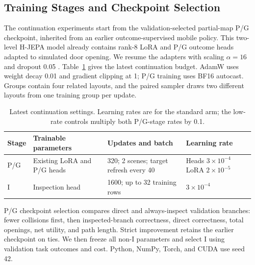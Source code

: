 \subsection{Training Stages and Checkpoint Selection}
The continuation experiments start from the validation-selected partial-map
P/G checkpoint, inherited from an earlier outcome-supervised mobile policy.
This two-level H-JEPA model already contains rank-8 LoRA and P/G outcome heads
adapted to simulated door opening. We resume the adapters with scaling $\alpha=16$ and
dropout 0.05 \citep{hu2021lora}. Table~\ref{tab:training} gives the latest
continuation budget. AdamW uses weight decay 0.01 and gradient clipping at 1;
P/G training uses BF16 autocast. Groups contain four related layouts, and the
paired sampler draws two different layouts from one training group per update.

\begin{table}[H]
\caption{Latest continuation settings. Learning rates are for the standard arm;
the low-rate controls multiply both P/G-stage rates by 0.1.}
\label{tab:training}
\centering\small
\begin{tabularx}{\linewidth}{@{}lXXX@{}}
\toprule
Stage & Trainable parameters & Updates and batch & Learning rate \\
\midrule
P/G & Existing LoRA and P/G heads & 320; 2 scenes; target refresh every 40
 & Heads \mbox{$3\times10^{-4}$}\newline LoRA \mbox{$2\times10^{-5}$} \\
I & Inspection head & 1600; up to 32 training rows & $3\times10^{-4}$ \\
\bottomrule
\end{tabularx}
\end{table}

P/G checkpoint selection compares direct and always-inspect validation
branches: fewer collisions first, then inspected-branch correctness, direct
correctness, total openings, net utility, and path length. Strict improvement
retains the earlier checkpoint on ties. We then freeze all non-I parameters
and select I using validation task outcomes and cost. Python, NumPy, Torch,
and CUDA use seed 42.
